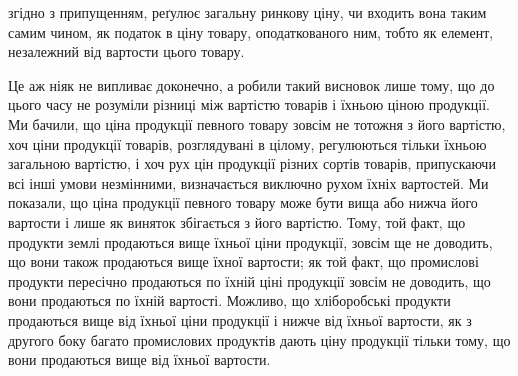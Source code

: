 \parcont{}  %
згідно з припущенням, реґулює загальну ринкову ціну, чи входить вона таким самим чином, як податок в
ціну товару, оподаткованого ним, тобто як елемент, незалежний від вартости цього товару.

       Це аж ніяк не випливає доконечно, а робили такий висновок лише тому,
що до цього часу не розуміли різниці між вартістю товарів і їхньою ціною
продукції. Ми бачили, що ціна продукції певного товару зовсім не тотожня
з його вартістю, хоч ціни продукції товарів, розглядувані в цілому, регулюються
тільки їхньою загальною вартістю, і хоч рух цін продукції різних сортів
товарів, припускаючи всі інші умови незмінними, визначається виключно
рухом їхніх вартостей. Ми показали, що ціна продукції певного товару може
бути вища або нижча його вартости і лише як виняток збігається з його вартістю.
Тому, той факт, що продукти землі продаються вище їхньої ціни продукції,
зовсім ще не доводить, що вони також продаються вище їхної вартости; як той факт, що промислові
продукти пересічно продаються по їхній ціні продукції зовсім не доводить, що вони продаються по
їхній вартості. Можливо, що хліборобські продукти продаються вище від їхньої ціни продукції і нижче
від їхньої вартости, як з другого боку багато промислових продуктів дають ціну продукції тільки
тому, що вони продаються вище від їхньої вартости.

